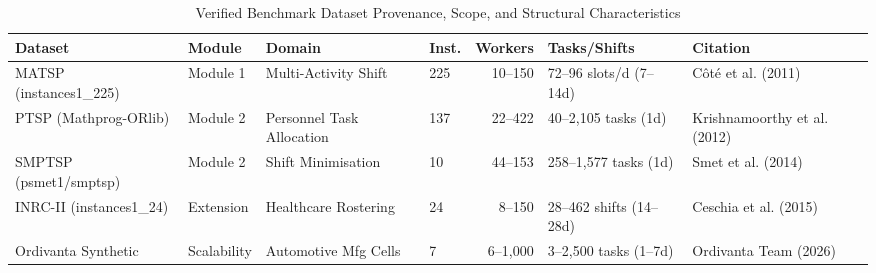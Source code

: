 \begin{table}[t]
\centering
\caption{Verified Benchmark Dataset Provenance, Scope, and Structural Characteristics}
\label{tab:dataset_provenance}
\small
\begin{tabular}{llllrll}
\hline
\textbf{Dataset} & \textbf{Module} & \textbf{Domain} & \textbf{Inst.} & \textbf{Workers} & \textbf{Tasks/Shifts} & \textbf{Citation} \\
\hline
MATSP (instances1\_225) & Module 1 & Multi-Activity Shift & 225 & 10--150 & 72--96 slots/d (7--14d) & C\^ot\'e et al. (2011) \\
PTSP (Mathprog-ORlib) & Module 2 & Personnel Task Allocation & 137 & 22--422 & 40--2,105 tasks (1d) & Krishnamoorthy et al. (2012) \\
SMPTSP (psmet1/smptsp) & Module 2 & Shift Minimisation & 10 & 44--153 & 258--1,577 tasks (1d) & Smet et al. (2014) \\
INRC-II (instances1\_24) & Extension & Healthcare Rostering & 24 & 8--150 & 28--462 shifts (14--28d) & Ceschia et al. (2015) \\
Ordivanta Synthetic & Scalability & Automotive Mfg Cells & 7 & 6--1,000 & 3--2,500 tasks (1--7d) & Ordivanta Team (2026) \\
\hline
\end{tabular}
\end{table}

